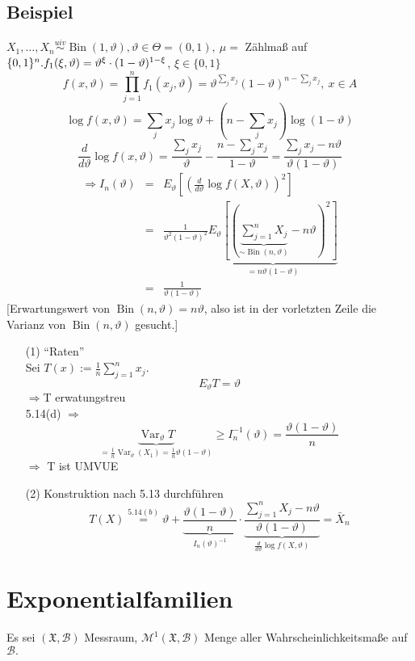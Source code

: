 \documentclass[a4paper,11pt,twoside,titlepage]{article}
\newcommand{\XX}{{\mathfrak X}} %
\newcommand{\MM}{{\mathcal M}}
\newcommand\BB{ \mathcal{B} } %
\newcommand{\uiv}{\ensuremath{\stackrel{uiv}{\sim}}}
\DeclareMathOperator{\var}{Var}
\DeclareMathOperator{\Bin}{Bin}
\begin{document}
\subsection{Beispiel}
$X_1,\ldots,X_n\uiv \Bin (1,\vartheta), \vartheta \in\Theta =(0,1),\ \mu =$ Zählmaß auf $\{0,1\}^n.\\
f_1(\xi,\vartheta)=\vartheta^\xi\cdot (1-\vartheta)^{1-\xi}$, $\xi\in\{0,1\}$
$$f(x,\vartheta)=\prod_{j=1}^nf_1(x_j,\vartheta)=\vartheta^{\sum_j x_j}(1-\vartheta)^{n-\sum_j x_j},\ x\in A$$
$$\log f(x,\vartheta)=\sum_jx_j\log \vartheta +(n-\sum_jx_j)\log (1-\vartheta)$$
$$\frac{d}{d\vartheta}\log f(x,\vartheta)=\frac{\sum_jx_j}{\vartheta}-\frac{n-\sum_jx_j}{1-\vartheta}=
\frac{\sum_jx_j-n\vartheta}{\vartheta(1-\vartheta)}$$
\begin{eqnarray*}\Rightarrow I_n(\vartheta)&=&E_\vartheta[(\frac{d}{d\vartheta} \log f(X,\vartheta))^2]\\&=&\frac{1}{\vartheta^2(1-\vartheta)^2}
\underbrace{E_\vartheta[(\underbrace{\sum_{j=1}^nX_j}_{\sim\Bin(n,\vartheta)}-n\vartheta)^2]}_{=n\vartheta(1-\vartheta)}\\
&=&\frac{1}{\vartheta(1-\vartheta)}\end{eqnarray*}
[Erwartungswert von $\Bin(n,\vartheta)=n\vartheta$, also ist in der vorletzten Zeile die Varianz von $\Bin(n,\vartheta)$ gesucht.] 
\begin{itemize}
\item[(1) ]"`Raten"'\\ Sei $T(x):=\frac1n\sum_{j=1}^nx_j.$\[E_\vartheta T=\vartheta\]$\Rightarrow $T erwatungstreu\\
5.14(d) $\Rightarrow$ \[\underbrace{\var_\vartheta T}_{=\frac1n\var_\vartheta(X_1)=\frac1n\vartheta(1-\vartheta)}
\geq I_n^{-1}(\vartheta)=\frac{\vartheta(1-\vartheta)}{n}\]$\Rightarrow$ T ist UMVUE
\item[(2) ]Konstruktion nach 5.13 durchführen
$$T(X)\stackrel{5.14(b)}{=} \vartheta+\underbrace{\frac{\vartheta(1-\vartheta)}{n}}_{I_n(\vartheta)^{-1}}\cdot
\underbrace{\frac{\sum_{j=1}^nX_j-n\vartheta}{\vartheta(1-\vartheta)}}_{\frac{d}{d\vartheta}\log f(X,\vartheta)}=\bar{X}_n$$
\end{itemize}

\cleardoublepage
\section{Exponentialfamilien}
Es sei $(\XX,\BB)$ Messraum, $\MM^1(\XX,\BB)$ Menge aller Wahrscheinlichkeitsmaße auf $\BB.$
\end{document}
